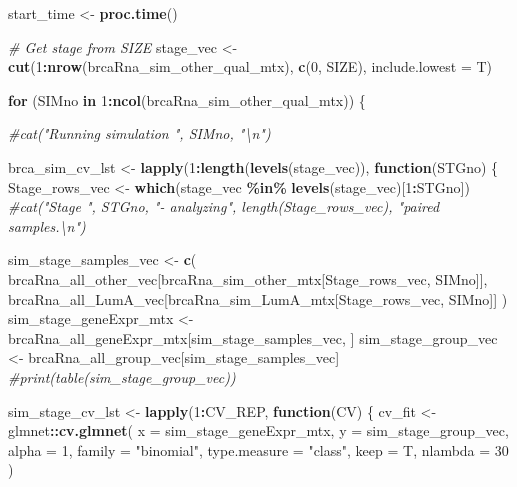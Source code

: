 \documentclass[
]{book}
\newenvironment{Shaded}{\begin{snugshade}}{\end{snugshade}}
\newcommand{\CommentTok}[1]{\textcolor[rgb]{0.56,0.35,0.01}{\textit{#1}}}
\newcommand{\ControlFlowTok}[1]{\textcolor[rgb]{0.13,0.29,0.53}{\textbf{#1}}}
\newcommand{\DataTypeTok}[1]{\textcolor[rgb]{0.13,0.29,0.53}{#1}}
\newcommand{\DecValTok}[1]{\textcolor[rgb]{0.00,0.00,0.81}{#1}}
\newcommand{\KeywordTok}[1]{\textcolor[rgb]{0.13,0.29,0.53}{\textbf{#1}}}
\newcommand{\NormalTok}[1]{#1}
\newcommand{\OperatorTok}[1]{\textcolor[rgb]{0.81,0.36,0.00}{\textbf{#1}}}
\newcommand{\StringTok}[1]{\textcolor[rgb]{0.31,0.60,0.02}{#1}}
\begin{document}
\begin{Shaded}
\begin{Highlighting}[]
\NormalTok{start\_time <{-}}\StringTok{ }\KeywordTok{proc.time}\NormalTok{()}

\CommentTok{\# Get stage from SIZE}
\NormalTok{stage\_vec <{-}}\StringTok{ }\KeywordTok{cut}\NormalTok{(}\DecValTok{1}\OperatorTok{:}\KeywordTok{nrow}\NormalTok{(brcaRna\_sim\_other\_qual\_mtx), }\KeywordTok{c}\NormalTok{(}\DecValTok{0}\NormalTok{, SIZE), }\DataTypeTok{include.lowest =}\NormalTok{ T)}

\ControlFlowTok{for}\NormalTok{ (SIMno }\ControlFlowTok{in} \DecValTok{1}\OperatorTok{:}\KeywordTok{ncol}\NormalTok{(brcaRna\_sim\_other\_qual\_mtx)) \{}

  \CommentTok{\#cat("Running simulation ", SIMno, "\textbackslash{}n")}

\NormalTok{  brca\_sim\_cv\_lst <{-}}\StringTok{ }\KeywordTok{lapply}\NormalTok{(}\DecValTok{1}\OperatorTok{:}\KeywordTok{length}\NormalTok{(}\KeywordTok{levels}\NormalTok{(stage\_vec)), }\ControlFlowTok{function}\NormalTok{(STGno) \{}
\NormalTok{    Stage\_rows\_vec <{-}}\StringTok{ }\KeywordTok{which}\NormalTok{(stage\_vec }\OperatorTok{\%in\%}\StringTok{ }\KeywordTok{levels}\NormalTok{(stage\_vec)[}\DecValTok{1}\OperatorTok{:}\NormalTok{STGno])}
    \CommentTok{\#cat("Stage ", STGno, "{-} analyzing", length(Stage\_rows\_vec), "paired samples.\textbackslash{}n")}

\NormalTok{    sim\_stage\_samples\_vec <{-}}\StringTok{ }\KeywordTok{c}\NormalTok{(}
\NormalTok{      brcaRna\_all\_other\_vec[brcaRna\_sim\_other\_mtx[Stage\_rows\_vec, SIMno]],}
\NormalTok{      brcaRna\_all\_LumA\_vec[brcaRna\_sim\_LumA\_mtx[Stage\_rows\_vec, SIMno]]}
\NormalTok{    )}
\NormalTok{    sim\_stage\_geneExpr\_mtx <{-}}\StringTok{ }\NormalTok{brcaRna\_all\_geneExpr\_mtx[sim\_stage\_samples\_vec, ]}
\NormalTok{    sim\_stage\_group\_vec <{-}}\StringTok{ }\NormalTok{brcaRna\_all\_group\_vec[sim\_stage\_samples\_vec]}
    \CommentTok{\#print(table(sim\_stage\_group\_vec))}

\NormalTok{    sim\_stage\_cv\_lst <{-}}\StringTok{ }\KeywordTok{lapply}\NormalTok{(}\DecValTok{1}\OperatorTok{:}\NormalTok{CV\_REP, }\ControlFlowTok{function}\NormalTok{(CV) \{}
\NormalTok{      cv\_fit <{-}}\StringTok{ }\NormalTok{glmnet}\OperatorTok{::}\KeywordTok{cv.glmnet}\NormalTok{(}
        \DataTypeTok{x =}\NormalTok{ sim\_stage\_geneExpr\_mtx,}
        \DataTypeTok{y =}\NormalTok{ sim\_stage\_group\_vec,}
        \DataTypeTok{alpha =} \DecValTok{1}\NormalTok{,}
        \DataTypeTok{family =} \StringTok{"binomial"}\NormalTok{,}
        \DataTypeTok{type.measure =} \StringTok{"class"}\NormalTok{,}
        \DataTypeTok{keep =}\NormalTok{ T,}
        \DataTypeTok{nlambda =} \DecValTok{30}
\NormalTok{      )}


\end{Highlighting}
\end{Shaded}
\end{document}
